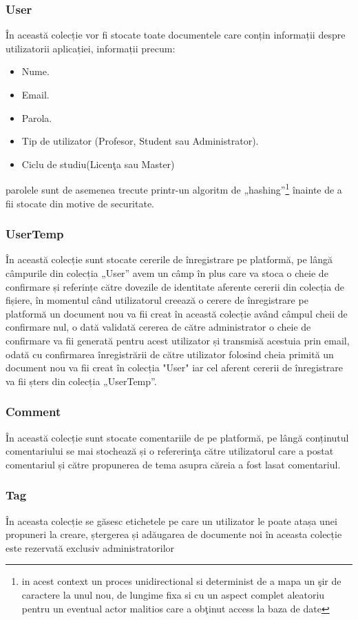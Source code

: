 \documentclass[12pt,a4paper,hidelinks]{report}
\theoremstyle{definition}
\theoremstyle{remark}
\begin{document}
\subsubsection{User}
În această colecție vor fi stocate toate documentele care conțin informații despre utilizatorii aplicației, informații precum:
\begin{itemize}
    \item Nume.
    \item Email.
    \item Parola.
    \item Tip de utilizator (Profesor, Student sau Administrator).
    \item Ciclu de studiu(Licen\c ta sau Master)    
\end{itemize}
parolele sunt de asemenea trecute printr-un algoritm de „hashing”\footnote[1]{ in acest context un proces unidirectional si determinist de a mapa un \c sir de caractere la unul nou, de lungime fixa si cu un aspect complet aleatoriu pentru un eventual actor malitios care a ob\c tinut access la baza de date} înainte de a fii stocate din motive de securitate.
\subsubsection{UserTemp}
În această colecție sunt stocate cererile de înregistrare pe platformă, pe lângă câmpurile din colecția „User” avem un câmp în plus care va stoca o cheie de confirmare și referințe către dovezile de identitate aferente cererii din colecția de fișiere, în momentul când utilizatorul creează o cerere de înregistrare pe platformă un document nou va fii creat în această colecție având câmpul cheii de confirmare nul, o dată validată cererea de către administrator o cheie de confirmare va fii generată pentru acest utilizator și transmisă acestuia prin email, odată cu confirmarea înregistrării de către utilizator folosind cheia primită un document nou va fii creat în colecția "User" iar cel aferent cererii de înregistrare va fii șters din colecția „UserTemp”.
\subsubsection{Comment}
În această colecție sunt stocate comentariile de pe platformă, pe lângă conținutul comentariului se mai stochează și o refererin\c ta către utilizatorul care a postat comentariul și către propunerea de tema asupra căreia a fost lasat comentariul.
\subsubsection{Tag}
În aceasta colecție se găsesc etichetele pe care un utilizator le poate atașa unei propuneri la creare, ștergerea și adăugarea de documente noi în aceasta colecție este rezervată exclusiv administratorilor
\end{document}
